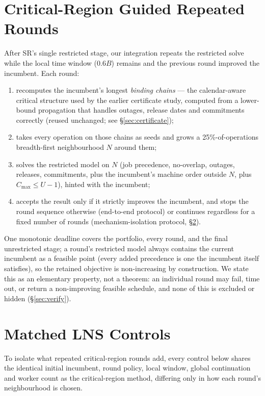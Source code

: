 \documentclass[letterpaper]{article} %
\newcommand{\base}{\textsc{SR}}
\begin{document}
\section{Critical-Region Guided Repeated Rounds}
\label{sec:method}

After \base's single restricted stage, our integration repeats the restricted solve while the local time window ($0.6B$) remains and the previous round improved the incumbent. Each round:
\begin{enumerate}
\item recomputes the incumbent's longest \emph{binding chains} --- the calendar-aware critical structure used by the earlier certificate study, computed from a lower-bound propagation that handles outages, release dates and commitments correctly (reused unchanged; see \S\ref{sec:certificate});
\item takes every operation on those chains as seeds and grows a 25\%-of-operations breadth-first neighbourhood $N$ around them;
\item solves the restricted model on $N$ (job precedence, no-overlap, outages, releases, commitments, plus the incumbent's machine order outside $N$, plus $C_{\max}\le U-1$), hinted with the incumbent;
\item accepts the result only if it strictly improves the incumbent, and stops the round sequence otherwise (end-to-end protocol) or continues regardless for a fixed number of rounds (mechanism-isolation protocol, \S\ref{sec:lns}).
\end{enumerate}
One monotonic deadline covers the portfolio, every round, and the final unrestricted stage; a round's restricted model always contains the current incumbent as a feasible point (every added precedence is one the incumbent itself satisfies), so the retained objective is non-increasing by construction. We state this as an elementary property, not a theorem: an individual round may fail, time out, or return a non-improving feasible schedule, and none of this is excluded or hidden (\S\ref{sec:verify}).

\section{Matched LNS Controls}
\label{sec:lns}

To isolate what repeated critical-region rounds add, every control below shares the identical initial incumbent, round policy, local window, global continuation and worker count as the critical-region method, differing only in how each round's neighbourhood is chosen.
\end{document}
